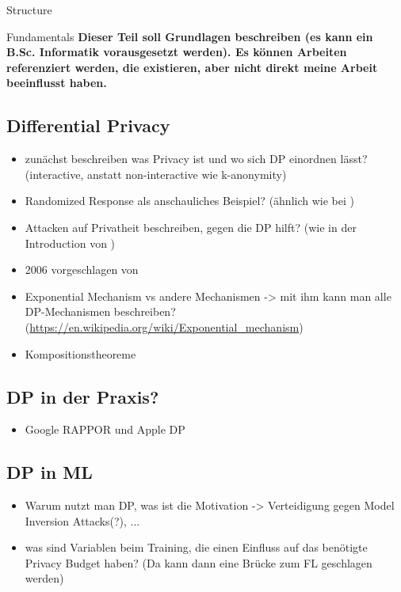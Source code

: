\begin{chapter}{Structure}
	\begin{section}{Fundamentals}
		\textbf{Dieser Teil soll Grundlagen beschreiben (es kann ein B.Sc. Informatik vorausgesetzt werden). Es können Arbeiten referenziert werden, die existieren, aber nicht direkt meine Arbeit beeinflusst haben.}
		
		\subsection{Differential Privacy}
		\begin{itemize}
			\item zunächst beschreiben was Privacy ist und wo sich DP einordnen lässt? (interactive, anstatt non-interactive wie k-anonymity)
			\item Randomized Response als anschauliches Beispiel? (ähnlich wie bei \cite[p.1]{erlingsson:2014})
			\item Attacken auf Privatheit beschreiben, gegen die DP hilft? (wie in der Introduction von \cite{abadi:2016})
			\item 2006 vorgeschlagen von \cite{dwork:2006}
			\item Exponential Mechanism vs andere Mechanismen -> mit ihm kann man alle DP-Mechanismen beschreiben? (\url{https://en.wikipedia.org/wiki/Exponential_mechanism})
			\item Kompositionstheoreme
		\end{itemize}
		
		\subsection{DP in der Praxis?}
		\begin{itemize}
			\item Google RAPPOR und Apple DP
		\end{itemize}
		
		\subsection{DP in ML}
		\begin{itemize}
			\item Warum nutzt man DP, was ist die Motivation -> Verteidigung gegen Model Inversion Attacks(?), ...
			\item was sind Variablen beim Training, die einen Einfluss auf das benötigte Privacy Budget haben? (Da kann dann eine Brücke zum FL geschlagen werden)
		\end{itemize}
		

\end{section}
\end{chapter}
